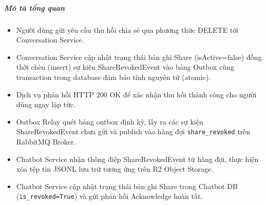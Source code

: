 \subparagraph{Mô tả tổng quan}

\begin{itemize}
\item Người dùng gửi yêu cầu thu hồi chia sẻ qua phương thức DELETE tới Conversation Service.
\item Conversation Service cập nhật trạng thái bản ghi Share (isActive=false) đồng thời chèn (insert) sự kiện ShareRevokedEvent vào bảng Outbox cùng transaction trong database đảm bảo tính nguyên tử (atomic).
\item Dịch vụ phản hồi HTTP 200 OK để xác nhận thu hồi thành công cho người dùng ngay lập tức.
\item Outbox Relay quét bảng outbox định kỳ, lấy ra các sự kiện ShareRevokedEvent chưa gửi và publish vào hàng đợi \texttt{share\_revoked} trên RabbitMQ Broker.
\item Chatbot Service nhận thông điệp ShareRevokedEvent từ hàng đợi, thực hiện xóa tệp tin JSONL lưu trữ tương ứng trên R2 Object Storage.
\item Chatbot Service cập nhật trạng thái bản ghi Share trong Chatbot DB (\texttt{is\_revoked=True}) và gửi phản hồi Acknowledge hoàn tất.
\end{itemize}
